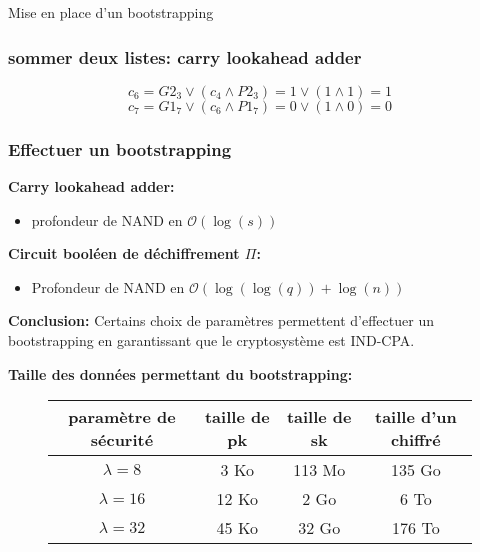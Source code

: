 \documentclass[10pt,xcolor={usenames,dvipsnames}]{beamer}
\begin{document}
\begin{section}{Mise en place d'un bootstrapping}

\begin{frame} 
\frametitle{sommer deux listes: carry lookahead adder}
  \begin{figure}
    \begin{center}
      \begin{tikzpicture}[scale = 0.7, transform shape]
      	
      \end{tikzpicture}
    \end{center}
  \end{figure}
\[c_6 = G2_3 \vee \left( c_4 \wedge P2_3\right) = 1 \vee \left( 1 \wedge 1 \right) = 1 \]
\[c_7 = G1_7 \vee \left( c_6 \wedge P1_7\right) = 0 \vee \left( 1 \wedge 0 \right) = 0 \]
\end{frame} 




\begin{frame} 
\frametitle{Effectuer un bootstrapping}



\textbf{Carry lookahead adder:}
\begin{itemize}
\item profondeur de NAND  en $\mathcal{O}(\log(s))$
\end{itemize}

\textbf{Circuit booléen de déchiffrement $\Pi$:}
\begin{itemize}
\item Profondeur de NAND en $\mathcal{O}(\log(\log(q)) + \log(n))$
\end{itemize}

\textbf{Conclusion:}
Certains choix de paramètres permettent d'effectuer un bootstrapping en garantissant que le cryptosystème est IND-CPA.
\pause

\textbf{Taille des données permettant du bootstrapping:}
\begin{figure}
\begin{tabular}{|c|c|c|c|}
\hline
paramètre de sécurité & taille de pk & taille de sk & taille d'un chiffré \\
\hline
$\lambda = 8$ & 3 Ko & 113 Mo & 135 Go \\
\hline
$\lambda = 16$ & 12 Ko & 2 Go & 6 To \\
\hline
$\lambda = 32$ & 45 Ko & 32 Go & 176 To \\
\hline
\end{tabular}
\end{figure}
\end{frame}

\end{section}
\end{document}
